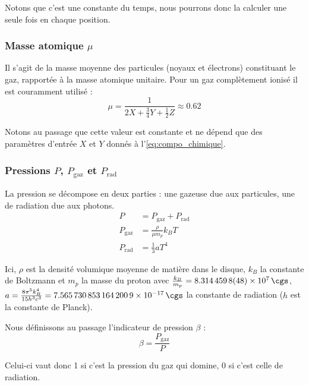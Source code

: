 Notons que c’est une constante du temps, nous pourrons donc la calculer une
seule fois en chaque position.

\subsubsection{\texorpdfstring{Masse atomique $\mu$}{Masse atomique μ}}

Il s’agit de la masse moyenne des particules (noyaux et électrons) constituant
le gaz, rapportée à la masse atomique unitaire. Pour un gaz complètement ionisé
il est couramment utilisé :
\begin{equation}
    \label{eq:masse_atomique}
    \mu = \frac{1}{2 X + \frac{3}{4} Y + \frac{1}{2} Z} \approx 0.62
\end{equation}

Notons au passage que cette valeur est constante et ne dépend que des
paramètres d’entrée $X$ et $Y$ donnés à l’\cref{eq:compo_chimique}.

\subsubsection{\texorpdfstring{Pressions $P$, $P_\mathrm{gaz}$ et $P_\mathrm{rad}$}{Pressions P, Pgaz et Prad}}

La pression se décompose en deux parties : une gazeuse due aux particules, une
de radiation due aux photons.
\begin{align}
    \label{eq:pression}
    P &= P_{\mathrm{gaz}} + P_{\mathrm{rad}} \\
    \label{eq:pression_gaz}
    P_{\mathrm{gaz}} &= \frac{\rho}{\mu m_p} k_B T \\
    \label{eq:pression_radiation}
    P_{\mathrm{rad}} &= \frac{1}{3} a T^4
\end{align}

Ici, $\rho$ est la densité volumique moyenne de matière dans le disque, $k_B$
la constante de Boltzmann et $m_p$ la masse du proton avec $\frac{k_B}{m_p} =
\SI{8.3144598(48)d7}{\cgs}$, $a = \frac{8 \pi^5 k_B^4}{15 h^3 c^3} =
\SI{7.5657308531642009e-17}{\cgs}$ la constante de radiation ($h$ est la
constante de Planck).

Nous définissons au passage l’indicateur de pression $\beta$ :
\begin{equation}
    \label{eq:indicateur_pression}
    \beta = \frac{P_{\mathrm{gaz}}}{P}
\end{equation}

Celui-ci vaut donc 1 si c’est la pression du gaz qui domine, 0 si c’est celle
de radiation.

